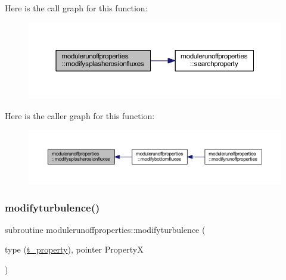 Here is the call graph for this function\+:\nopagebreak
\begin{figure}[H]
\begin{center}
\leavevmode
\includegraphics[width=350pt]{namespacemodulerunoffproperties_a9ac3ca2c6f3cf83428d37c39365ba1ec_cgraph}
\end{center}
\end{figure}
Here is the caller graph for this function\+:\nopagebreak
\begin{figure}[H]
\begin{center}
\leavevmode
\includegraphics[width=350pt]{namespacemodulerunoffproperties_a9ac3ca2c6f3cf83428d37c39365ba1ec_icgraph}
\end{center}
\end{figure}
\mbox{\label{namespacemodulerunoffproperties_a8f78696440cd79402c857e4191fd185e}} 
\subsubsection{\texorpdfstring{modifyturbulence()}{modifyturbulence()}}
{\footnotesize\ttfamily subroutine modulerunoffproperties\+::modifyturbulence (\begin{DoxyParamCaption}\item[{type (\mbox{\hyperlink{structmodulerunoffproperties_1_1t__property}{t\+\_\+property}}), pointer}]{PropertyX }\end{DoxyParamCaption})\hspace{0.3cm}{\ttfamily [private]}}

